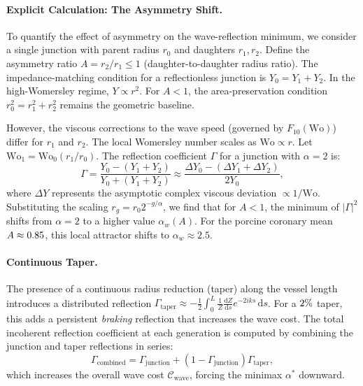 \documentclass[11pt,a4paper]{article}
\theoremstyle{remark}
\begin{document}
\paragraph{Explicit Calculation: The Asymmetry Shift.}
To quantify the effect of asymmetry on the wave-reflection minimum, we
consider a single junction with parent radius $r_0$ and daughters $r_1, r_2$.
Define the asymmetry ratio $A = r_2/r_1 \le 1$ (daughter-to-daughter radius
ratio). The impedance-matching condition for a reflectionless junction is $Y_0 =
Y_1 + Y_2$. In the high-Womersley regime, $Y \propto r^2$. For $A < 1$, the
area-preservation condition $r_0^2 = r_1^2 + r_2^2$ remains the geometric
baseline.

However, the viscous corrections to the wave speed (governed by
$F_{10}(\mathrm{Wo})$) differ for $r_1$ and $r_2$. The local Womersley number
scales as $\mathrm{Wo} \propto r$. Let $\mathrm{Wo}_1 = \mathrm{Wo}_0
(r_1/r_0)$. The reflection coefficient $\Gamma$ for a junction with $\alpha = 2$
is:
\begin{equation}
    \Gamma = \frac{Y_0 - (Y_1 + Y_2)}{Y_0 + (Y_1 + Y_2)} \approx \frac{\Delta Y_0 - (\Delta Y_1 + \Delta Y_2)}{2 Y_0},
\end{equation}
where $\Delta Y$ represents the asymptotic complex viscous deviation $\propto
1/\mathrm{Wo}$. Substituting the scaling $r_g = r_0 2^{-g/\alpha}$, we find that
for $A < 1$, the minimum of $|\Gamma|^2$ shifts from $\alpha=2$ to a higher
value $\alpha_w(A)$. For the porcine coronary mean $A \approx
0.85$, this local attractor shifts to $\alpha_w \approx 2.5$.

\paragraph{Continuous Taper.}
The presence of a continuous radius reduction (taper) along the vessel length
introduces a distributed reflection $\Gamma_{\mathrm{taper}} \approx -
\frac{1}{2} \int_0^L \frac{1}{Z} \frac{\mathrm{d}Z}{\mathrm{d}s} e^{-2iks} \,
\mathrm{d}s$. For a $2\%$ taper, this adds a persistent
\emph{braking} reflection that increases the wave cost. The total incoherent
reflection coefficient at each generation is computed by combining the junction
and taper reflections in series:
\begin{equation}
    \Gamma_{\mathrm{combined}} = \Gamma_{\mathrm{junction}} + (1 - \Gamma_{\mathrm{junction}}) \Gamma_{\mathrm{taper}},
\end{equation}
which increases the overall wave cost $\mathcal{C}_{\mathrm{wave}}$, forcing the
minimax $\alpha^*$ downward.
\end{document}
